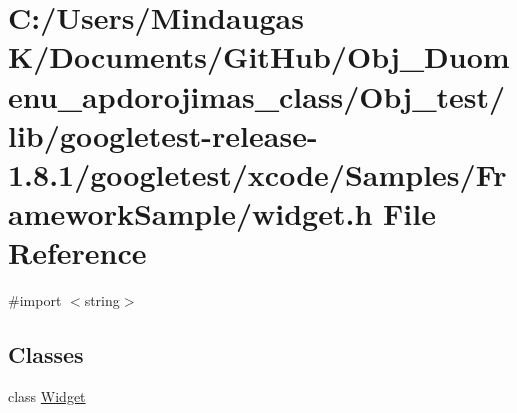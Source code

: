 \hypertarget{_obj__test_2lib_2googletest-release-1_88_81_2googletest_2xcode_2_samples_2_framework_sample_2widget_8h}{}\section{C\+:/\+Users/\+Mindaugas K/\+Documents/\+Git\+Hub/\+Obj\+\_\+\+Duomenu\+\_\+apdorojimas\+\_\+class/\+Obj\+\_\+test/lib/googletest-\/release-\/1.8.1/googletest/xcode/\+Samples/\+Framework\+Sample/widget.h File Reference}
\label{_obj__test_2lib_2googletest-release-1_88_81_2googletest_2xcode_2_samples_2_framework_sample_2widget_8h}
{\ttfamily \#import $<$string$>$}\newline
\subsection*{Classes}
\begin{DoxyCompactItemize}
\item 
class \mbox{\hyperlink{class_widget}{Widget}}
\end{DoxyCompactItemize}
